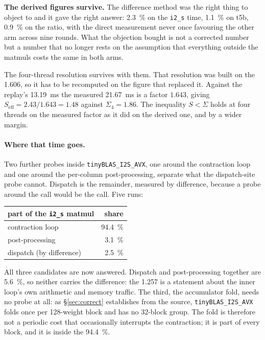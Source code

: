 \documentclass[11pt,a4paper]{article}
\newcommand{\code}[1]{\texttt{#1}}
\begin{document}
\textbf{The derived figures survive.} The difference method was the right thing
to object to and it gave the right answer: \SI{2.3}{\percent} on the
\code{i2\_s} time, \SI{1.1}{\percent} on t5b, \SI{0.9}{\percent} on the ratio,
with the direct measurement never once favouring the other arm across nine
rounds. What the objection bought is not a corrected number but a number that no
longer rests on the assumption that everything outside the matmuls costs the
same in both arms.

The four-thread resolution survives with them. That resolution was
built on the \num{1.606}, so it has to be recomputed on the figure that replaced
it. Against the replay's \SI{13.19}{\milli\second} the measured
\SI{21.67}{\milli\second} is a factor $\num{1.643}$, giving
$S_{\mathrm{eff}} = \num{2.43}/\num{1.643} = \num{1.48}$ against
$\Sigma_{4}=\num{1.86}$. The inequality $S<\Sigma$ holds at four threads on the
measured factor as it did on the derived one, and by a wider margin.

\paragraph{Where that time goes.} Two further probes inside
\code{tinyBLAS\_I2S\_AVX}, one around the contraction loop and one around the
per-column post-processing, separate what the dispatch-site probe cannot.
Dispatch is the remainder, measured by difference, because a probe around the
call would be the call. Five runs:

\begin{center}
\begin{tabular}{lr}
\toprule
part of the \code{i2\_s} matmul & share \\
\midrule
contraction loop        & \SI{94.4}{\percent} \\
post-processing         & \SI{3.1}{\percent} \\
dispatch (by difference) & \SI{2.5}{\percent} \\
\bottomrule
\end{tabular}
\end{center}

All three candidates are now answered. Dispatch and post-processing
together are \SI{5.6}{\percent}, so neither carries the difference: the
\num{1.257} is a statement about the inner loop's own arithmetic and memory
traffic. The third, the accumulator fold, needs no probe at all: as
\S\ref{sec:correct} establishes from the source, \code{tinyBLAS\_I2S\_AVX} folds
once per 128-weight block and has no 32-block group. The fold is therefore not a
periodic cost that occasionally interrupts the contraction; it is part of every
block, and it is inside the \SI{94.4}{\percent}.
\end{document}
